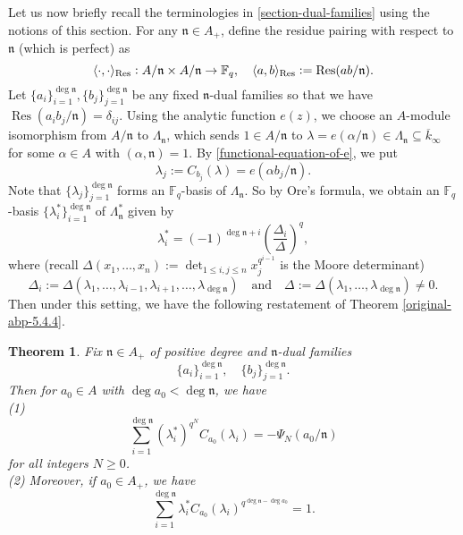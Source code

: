 \documentclass[11pt]{amsart}
\theoremstyle{plain}
\newtheorem{thm}{Theorem}[subsection]
\theoremstyle{definition}
\theoremstyle{remark}
\numberwithin{equation}{section}
\newcommand{\FF}{\mathbb{F}}
\newcommand{\nfk}{\mathfrak{n}}
\newcommand{\Res}{\operatorname{Res}}
\newcommand{\ovl}{\overline}
\newcommand{\sbe}{\subseteq}
\newcommand{\Fq}{\FF_q}
\DeclarePairedDelimiter{\angres}{\langle}{\rangle_{\textnormal{Res}}}
\begin{document}
	Let us now briefly recall the terminologies in \ref{section-dual-families} using the notions of this section.
	For any $\nfk \in A_+$, define the residue pairing with respect to $\nfk$ (which is perfect) as
	$$
	\angres{\cdot,\cdot}: A/\nfk \times A/\nfk \to \Fq,
	\quad
	\angres{a,b} := \Res(ab/\nfk).
	$$
	Let $\{a_i\}_{i=1}^{\deg\nfk}, \{b_j\}_{j=1}^{\deg\nfk}$ be any fixed $\nfk$-dual families so that we have $\Res(a_ib_j/\nfk) = \delta_{ij}$.
	Using the analytic function $e(z)$, we choose an $A$-module isomorphism from $A/\nfk$ to $\Lambda_\nfk$, which sends $1 \in A/\nfk$ to $\lambda = e(\alpha/\nfk) \in \Lambda_\nfk \sbe \ovl{k}_\infty$ for some $\alpha\in A$ with $(\alpha,\nfk)=1$.
	By \eqref{functional-equation-of-e}, we put
	\begin{equation}    \label{lambda-j}
		\lambda_j := C_{b_j}(\lambda) = e(\alpha b_j/\nfk).
	\end{equation}
	Note that $\{\lambda_j\}_{j=1}^{\deg\nfk}$ forms an $\Fq$-basis of $\Lambda_\nfk$.
	So by Ore's formula, we obtain an $\Fq$-basis $\{\lambda^*_i\}_{i=1}^{\deg\nfk}$ of $\Lambda_\nfk^*$ given by
	$$
	\lambda_i^* = (-1)^{\deg\nfk+i} \left(\frac{\Delta_i}{\Delta}\right)^q,
	$$
	where (recall $\Delta(x_1,\ldots,x_n) := \det_{1 \leq i,j \leq n} x_j^{q^{i-1}}$ is the Moore determinant)
	$$
	\Delta_i := \Delta(\lambda_1,\ldots,\lambda_{i-1},\lambda_{i+1},\ldots,\lambda_{\deg\nfk})
	\quad
	\text{and}
	\quad
	\Delta := \Delta(\lambda_1,\ldots,\lambda_{\deg\nfk}) \neq 0.
	$$
	Then under this setting, we have the following restatement of Theorem \ref{original-abp-5.4.4}.
	
	\begin{thm}      \label{restatement-of-abp-5.4.4-last-section}
		Fix $\nfk \in A_+$ of positive degree and $\nfk$-dual families 
		$$
		\{a_i\}_{i=1}^{\deg\nfk},
		\quad
		\{b_j\}_{j=1}^{\deg\nfk}.
		$$
		Then for $a_0 \in A$ with $\deg a_0 < \deg \nfk$, we have   \\
		(1)
		$$
		\sum_{i=1}^{\deg \nfk} (\lambda_i^*)^{q^N} C_{a_0}(\lambda_i) = -\Psi_N(a_0/\nfk)
		$$
		for all integers $N\geq 0$.   \\
		(2) Moreover, if $a_0 \in A_+$, we have
		$$
		\sum_{i=1}^{\deg \nfk} \lambda_i^* C_{a_0}(\lambda_i)^{q^{\deg \nfk - \deg a_0}} = 1.
		$$
	\end{thm}
	
\end{document}

